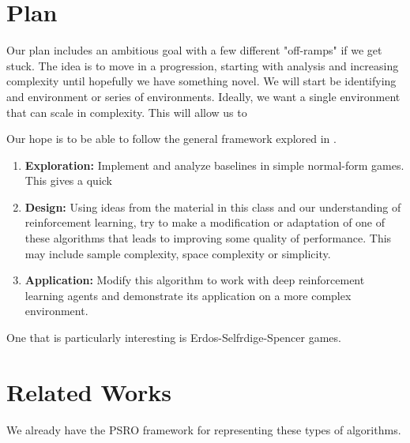 \documentclass{article}
\begin{document}
\section{Plan}
Our plan includes an ambitious goal with a few different "off-ramps" if we get
stuck. The idea is to move in a progression, starting with analysis and
increasing complexity until hopefully we have something novel. We will start be
identifying and environment or series of environments. Ideally, we want a single
environment that can scale in complexity. This will allow us to 

Our hope is to be able to follow the general framework explored in \cite{dip}.
\begin{enumerate}
	\item \textbf{Exploration:} Implement and analyze baselines in simple
        normal-form games. This gives a quick 
	\item \textbf{Design:} Using ideas from the material in this class and our
		understanding of reinforcement learning, try to make a modification or
		adaptation of one of these algorithms that leads to improving some
		quality of performance. This may include sample complexity, space complexity or
		simplicity.
    \item \textbf{Application:} Modify this algorithm to work with deep reinforcement learning agents
      and demonstrate its application on a more complex environment.
\end{enumerate}

One that is particularly interesting is Erdos-Selfrdige-Spencer \cite{ESS} games.

\section{Related Works}
We already have the PSRO \cite{PSRO} framework for representing these types of
algorithms. 




\end{document}
